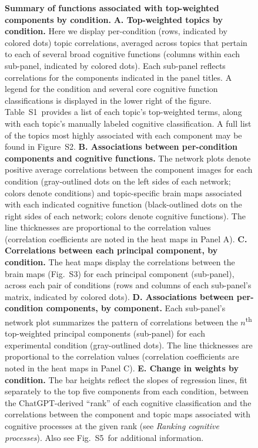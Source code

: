 \documentclass[english, 11pt]{article}
\newcommand{\topTerms}{S2}
\newcommand{\componentBrains}{S3}
\newcommand{\neurosynthFull}{S5}
\newcommand{\topics}{S1}
\begin{document}
\begin{figure}[tp]
\caption{\textbf{Summary of functions associated with top-weighted components
by condition.} \textbf{A. Top-weighted topics by condition.} Here we display
per-condition (rows, indicated by colored dots) topic correlations, averaged
across topics that pertain to each of several broad cognitive functions
(columns within each sub-panel, indicated by colored dots). Each sub-panel
reflects correlations for the components indicated in the panel titles. A
legend for the condition and several core cognitive function classifications is
displayed in the lower right of the figure. Table~\topics~provides a list of
each topic's top-weighted terms, along with each topic's manually labeled
cognitive classification. A full list of the topics most highly associated with
each component may be found in Figure~\topTerms. \textbf{B. Associations
between per-condition components and cognitive functions.} The network plots
denote positive average correlations between the component images for each
condition (gray-outlined dots on the left sides of each network; colors denote
conditions) and topic-specific brain maps associated with each indicated
cognitive function (black-outlined dots on the right sides of each network;
colors denote cognitive functions). The line thicknesses are proportional to
the correlation values (correlation coefficients are noted in the heat maps in
Panel A). \textbf{C. Correlations between each principal component, by
condition.} The heat maps display the correlations between the brain maps
(Fig.~\componentBrains) for each principal component (sub-panel), across each
pair of conditions (rows and columns of each sub-panel's matrix, indicated by
colored dots). \textbf{D. Associations between per-condition components, by
component.} Each sub-panel's network plot summarizes the pattern of correlations
between the $n$\textsuperscript{th} top-weighted principal components
(sub-panel) for each experimental condition (gray-outlined dots). The line
thicknesses are proportional to the correlation values (correlation
coefficients are noted in the heat maps in Panel C). \textbf{E. Change in
weights by condition.} The bar heights reflect the slopes of regression lines,
fit separately to the top five components from each condition, between the
ChatGPT-derived ``rank'' of each cognitive classification and the correlations
between the component and topic maps associated with cognitive processes at the
given rank (see \textit{Ranking cognitive processes}).  Also see
Fig.~\neurosynthFull~for additional information.}

\label{fig:neurosynth-summary}
\end{figure}
\end{document}
